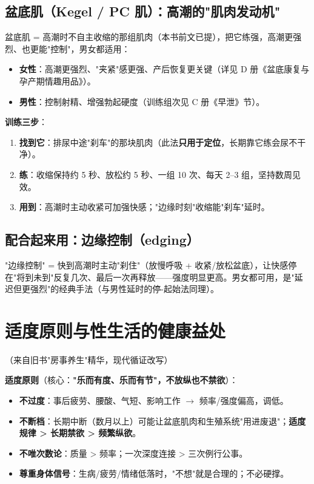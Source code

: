 \documentclass[12pt,UTF8,openany]{ctexbook}
\begin{document}
\subsection*{盆底肌（Kegel / PC 肌）：高潮的"肌肉发动机"}
盆底肌 = 高潮时不自主收缩的那组肌肉（本书前文已提），把它练强，高潮更强烈、也更能"控制"，男女都适用：
\begin{itemize}[leftmargin=2em,itemsep=0.2em]
  \item \textbf{女性}：高潮更强烈、"夹紧"感更强、产后恢复更关键（详见 D 册《盆底康复与孕产期情趣用品》）。
  \item \textbf{男性}：控制射精、增强勃起硬度（训练组次见 C 册《早泄》节）。
\end{itemize}
\textbf{训练三步}：
\begin{enumerate}[leftmargin=2em,itemsep=0.2em]
  \item \textbf{找到它}：排尿中途"刹车"的那块肌肉（此法\textbf{只用于定位}，长期靠它练会尿不干净）。
  \item \textbf{练}：收缩保持约 5 秒、放松约 5 秒、一组 10 次、每天 2--3 组，坚持数周见效。
  \item \textbf{用到}：高潮时主动收紧可加强快感；"边缘时刻"收缩能"刹车"延时。
\end{enumerate}

\subsection*{配合起来用：边缘控制（edging）}
"边缘控制" = 快到高潮时主动"刹住"（放慢呼吸 + 收紧/放松盆底），让快感停在"将到未到"反复几次、最后一次再释放——强度明显更高。男女都可用，是"延迟但更强烈"的经典手法（与男性延时的停-起始法同理）。

\section{适度原则与性生活的健康益处}（来自旧书"房事养生"精华，现代循证改写）

\textbf{适度原则}（核心：\textbf{"乐而有度、乐而有节"，不放纵也不禁欲}）：

\begin{itemize}[leftmargin=2em,itemsep=0.3em]
  \item \textbf{不过度}：事后疲劳、腰酸、气短、影响工作 $\to$ 频率/强度偏高，调低。
  \item \textbf{不断档}：长期中断（数月以上）可能让盆底肌肉和生殖系统"用进废退"；\textbf{适度规律 > 长期禁欲 > 频繁纵欲}。
  \item \textbf{不唯次数论}：质量 > 频率；一次深度连接 > 三次例行公事。
  \item \textbf{尊重身体信号}：生病/疲劳/情绪低落时，"不想"就是合理的；不必硬撑。
\end{itemize}
\end{document}
